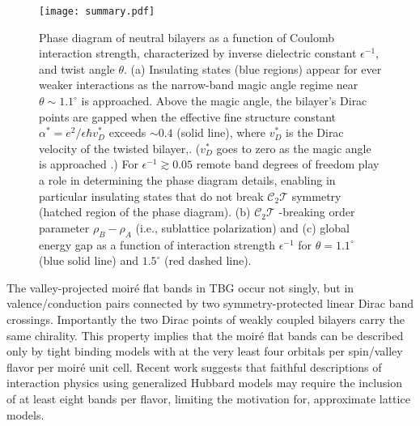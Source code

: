 \documentclass[aps,prl,reprint,amssymb,groupedaddress,twocolumn]{revtex4}
\newcommand{\CT}{$\mathcal{C}_2\mathcal{T}$ }
\begin{document}
\begin{figure}[h]
	\begin{center}
		\texttt{[image: summary.pdf]}
		\caption{
		Phase diagram of neutral bilayers as a function of Coulomb interaction strength, 
		                characterized by inverse dielectric constant $\epsilon^{-1}$, and twist angle $\theta$. 
		                (a)  Insulating states (blue regions) appear for ever weaker interactions as the 
                               narrow-band magic angle regime near $\theta \sim 1.1^{\circ}$
                                is approached.  Above the magic angle, the bilayer's Dirac points are gapped when the 
                               effective fine structure constant $\alpha^*=e^2/\epsilon\hbar v_D^*$ exceeds $\sim 0.4$ (solid line),
                               where $v_D^*$ is the Dirac velocity of the twisted bilayer,. 
                                ($v_D^*$ goes to zero as the magic angle is approached \cite{BMModel}.) 
                               For $\epsilon^{-1}  \gtrsim 0.05$ remote band degrees of freedom play a role in determining 
                               the phase diagram details, enabling in particular insulating states that do not break  \CT symmetry (hatched 
                               region of the phase diagram).
                        (b)  \CT-breaking order parameter $\rho_B-\rho_A$ (i.e., sublattice polarization) and 
                        (c) global energy gap as a function of  interaction strength $\epsilon^{-1}$ 
                        for $\theta=1.1^{\circ}$ (blue solid line) and $1.5^{\circ}$ (red dashed line).
                        }
		\label{Summary}
	\end{center}
\end{figure}

The valley-projected moir\'e flat bands in TBG occur
not singly, but in valence/conduction pairs connected by two symmetry-protected  
linear Dirac band crossings.
Importantly the two Dirac points of weakly coupled bilayers carry the same chirality.  
This property implies \cite{VishwanathWannierObstructions,VishwanathMarch, Bernevig} 
that the moir\'e flat bands can be described only by tight binding models with at the very 
least four orbitals per spin/valley flavor per moir\'e unit cell.  
Recent work \cite{VishwanathAugust} suggests that faithful descriptions of 
interaction physics using generalized Hubbard
models may require the inclusion of at  least eight bands per flavor, limiting the motivation for,
approximate lattice models.
\end{document}
